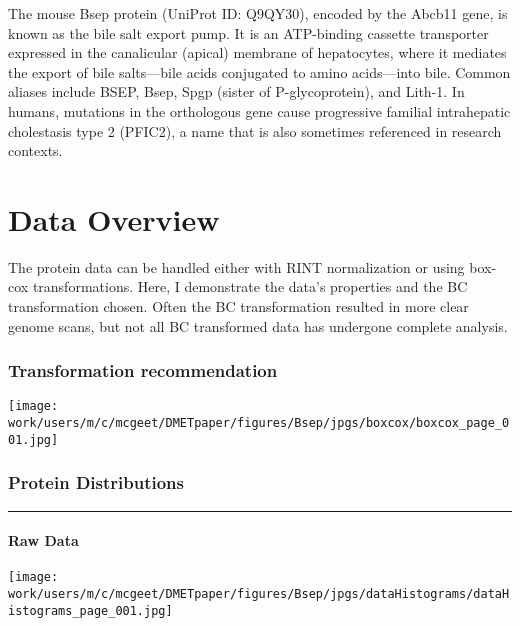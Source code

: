 \documentclass[
  letterpaper,
  DIV=11,
  numbers=noendperiod]{scrreprt}
\begin{document}
The mouse Bsep protein (UniProt ID: Q9QY30), encoded by the Abcb11 gene,
is known as the bile salt export pump. It is an ATP-binding cassette
transporter expressed in the canalicular (apical) membrane of
hepatocytes, where it mediates the export of bile salts---bile acids
conjugated to amino acids---into bile. Common aliases include BSEP,
Bsep, Spgp (sister of P-glycoprotein), and Lith-1. In humans, mutations
in the orthologous gene cause progressive familial intrahepatic
cholestasis type 2 (PFIC2), a name that is also sometimes referenced in
research contexts.


\chapter{Data Overview}\label{data-overview}

The protein data can be handled either with RINT normalization or using
box-cox transformations. Here, I demonstrate the data's properties and
the BC transformation chosen. Often the BC transformation resulted in
more clear genome scans, but not all BC transformed data has undergone
complete analysis.

\subsection{Transformation
recommendation}\label{transformation-recommendation}

\begin{center}
\texttt{[image: work/users/m/c/mcgeet/DMETpaper/figures/Bsep/jpgs/boxcox/boxcox\_page\_001.jpg]}
\end{center}

\subsection{Protein Distributions}\label{protein-distributions}

\begin{center}\rule{0.5\linewidth}{0.5pt}\end{center}

\subsubsection{Raw Data}\label{raw-data}

\begin{center}
\texttt{[image: work/users/m/c/mcgeet/DMETpaper/figures/Bsep/jpgs/dataHistograms/dataHistograms\_page\_001.jpg]}
\end{center}
\end{document}
